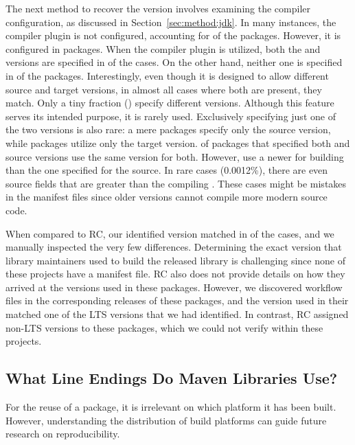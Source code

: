 \documentclass[smallextended]{svjour3}
\newcommand{\secref}[1]{Section~\ref{sec:#1}}
\newcommand{\maven}[1]{\tool{Maven{#1}}}
\newcommand{\github}[1]{\tool{github{#1}}}
\newcommand{\java}{\tool{Java}}
\begin{document}
The next method to recover the  version involves examining the compiler configuration, as discussed in \secref{method:jdk}. In many instances, the \maven{} compiler plugin is not configured, accounting for  of the packages. However, it is configured in  packages. When the \maven{} compiler plugin is utilized, both the  and  versions are specified in  of the cases. On the other hand, neither one is specified in  of the packages. Interestingly, even though it is designed to allow different source and target versions, in almost all cases where both are present, they match. Only a tiny fraction () specify different versions. Although this feature serves its intended purpose, it is rarely used. Exclusively specifying just one of the two versions is also rare: a mere  packages specify only the source version, while  packages utilize only the target version.
 of packages that specified both  and source versions use the same version for both. However,  use a newer  for building than the one specified for the source. In rare cases (0.0012\%), there are even source fields that are greater than the compiling . These cases might be mistakes in the manifest files since older versions cannot compile more modern source code. 


When compared to RC, our identified  version matched in  of the cases, and we manually inspected the very few differences. Determining the exact version that library maintainers used to build the released library is challenging since none of these projects have a manifest file. RC also does not provide details on how they arrived at the versions used in these packages. However, we discovered \github{} workflow files in the corresponding \github{} releases of these packages, and the \java{} version used in their  matched one of the LTS versions that we had identified.
In contrast, RC assigned non-LTS versions to these packages, which we could not verify within these projects.


\subsection{What Line Endings Do Maven Libraries Use?}

For the reuse of a package, it is irrelevant on which platform it has been built. However, understanding the distribution of build platforms can guide future research on reproducibility.
\end{document}
